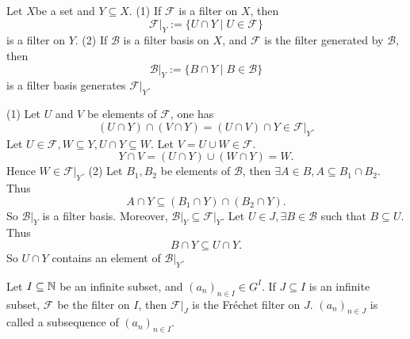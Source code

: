 \begin{propositionenv}
    Let $X$be a set and $Y\subseteq X$.\newline
    (1) If $\mathcal{F}$ is a filter on $X$, then 
    $$\left.\mathcal{F}\right|_Y:=\{U\cap Y\mid U\in \mathcal{F}\}$$
    is a filter on $Y$.
    \newline
    (2) If $\mathcal{B}$ is a filter basis on $X$, and $\mathcal{F}$ is the filter generated by $\mathcal{B}$, then 
    $$\left.\mathcal{B}\right|_Y:=\{B\cap Y\mid B\in \mathcal{B}\}$$
    is a filter basis generates $\left.\mathcal{F}\right|_Y$.
\end{propositionenv}
\begin{proofenv}
    \quad 
    \newline
    (1) Let $U$ and $V$ be elements of $\mathcal{ F}$, one has 
    $$(U\cap Y)\cap (V\cap Y)=(U\cap V)\cap Y\in \left.\mathcal{F}\right|_Y.$$
    Let $U\in \mathcal{F}, W\subseteq Y,U\cap Y\subseteq W$. Let $V=U\cup W\in \mathcal{F}$.
    $$Y\cap V=(U\cap Y)\cup(W\cap Y)=W.$$
    Hence $W\in \left.\mathcal{F}\right|_Y.$
    \newline
    (2) Let $B_1,B_2$ be elements of $\mathcal{B}$, then $\exists A\in B, A\subseteq B_1\cap B_2.$ Thus 
    $$A\cap Y\subseteq(B_1\cap Y)\cap (B_2\cap Y).$$
    So $\left.\mathcal{ B}\right|_Y$ is a filter basis. Moreover, $\left.\mathcal{B}\right|_Y\subseteq\left.\mathcal{F}\right|_Y$. Let $U\in J, \exists B\in \mathcal{B}$ such that $B\subseteq U$. Thus 
    $$B\cap Y\subseteq U\cap Y.$$
    So $U\cap Y$  contains an element of $\left.\mathcal{B}\right|_Y$.
\end{proofenv}
\begin{exampleenv}
    Let $I\subseteq \mathbb{N}$ be an infinite subset, and $(a_n)_{n\in I}\in G^I$. If $J\subseteq I$ is an infinite subset, $\mathcal{F}$ be the filter on $I$, then $\mathcal{F}|_J$ is the Fréchet filter on $J$. $(a_n)_{n\in J}$ is called a subsequence of $(a_n)_{n\in I}$.
\end{exampleenv}
